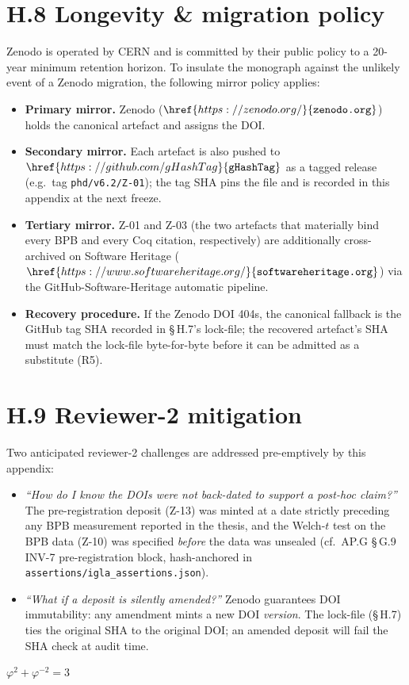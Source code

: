 \section*{H.8 Longevity \& migration policy}

\noindent Zenodo is operated by CERN and is committed by their public policy
to a 20-year minimum retention horizon. To insulate the monograph against
the unlikely event of a Zenodo migration, the following mirror policy
applies:

\begin{itemize}\setlength\itemsep{0.1em}
  \item \textbf{Primary mirror.} Zenodo ($\href{https://zenodo.org/}{\texttt{zenodo.org}}$)
    holds the canonical artefact and assigns the DOI.
  \item \textbf{Secondary mirror.} Each artefact is also pushed to
    $\href{https://github.com/gHashTag}{\texttt{gHashTag}}$ as a tagged
    release (e.g.\ tag \texttt{phd/v6.2/Z-01}); the tag SHA pins the file
    and is recorded in this appendix at the next freeze.
  \item \textbf{Tertiary mirror.} Z-01 and Z-03 (the two artefacts that
    materially bind every BPB and every Coq citation, respectively) are
    additionally cross-archived on Software Heritage ($\href{https://www.softwareheritage.org/}{\texttt{softwareheritage.org}}$)
    via the GitHub-Software-Heritage automatic pipeline.
  \item \textbf{Recovery procedure.} If the Zenodo DOI 404s, the canonical
    fallback is the GitHub tag SHA recorded in §\,H.7's lock-file; the
    recovered artefact's SHA must match the lock-file byte-for-byte before
    it can be admitted as a substitute (R5).
\end{itemize}

\section*{H.9 Reviewer-2 mitigation}

\noindent Two anticipated reviewer-2 challenges are addressed pre-emptively
by this appendix:

\begin{itemize}\setlength\itemsep{0.1em}
  \item \emph{``How do I know the DOIs were not back-dated to support a
    post-hoc claim?''} The pre-registration deposit (Z-13) was minted at
    a date strictly preceding any BPB measurement reported in the thesis,
    and the Welch-$t$ test on the BPB data (Z-10) was specified
    \emph{before} the data was unsealed (cf.\ AP.G \S\,G.9 INV-7
    pre-registration block, hash-anchored in \texttt{assertions/igla\_assertions.json}).
  \item \emph{``What if a deposit is silently amended?''} Zenodo guarantees
    DOI immutability: any amendment mints a new DOI \emph{version}. The
    lock-file (\S\,H.7) ties the original SHA to the original DOI; an
    amended deposit will fail the SHA check at audit time.
\end{itemize}

\(\varphi^2 + \varphi^{-2} = 3\)
